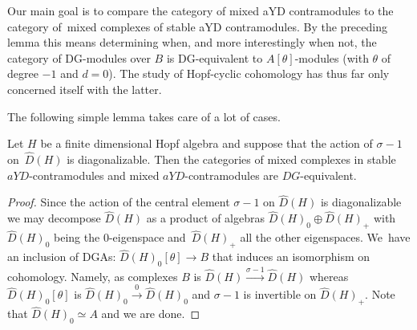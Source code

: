 Our main goal is to compare the category of mixed
aYD contramodules to the category of~mixed complexes of stable aYD
contramodules. By the preceding lemma this means determining when,
and more interestingly when not, the category of DG-modules over $B$ is DG-equivalent to $A[\theta]$-modules (with $\theta$ of degree $-1$ and $d=0$). The study of Hopf-cyclic cohomology has thus far only concerned itself with the latter.

The following simple lemma takes care of a lot of cases.

\begin{Lemma}\label{diag}
Let $H$ be a finite dimensional Hopf algebra and suppose that the action of $\sigma-1$ on~$\widehat{D}(H)$ is diagonalizable. Then the categories of mixed complexes in stable $aYD$-contramodules and mixed $aYD$-contramodules are $DG$-equivalent.
\end{Lemma}

\begin{proof}
Since the action of the central element $\sigma-1$ on $\widehat{D}(H)$ is diagonalizable we may decom\-pose $\widehat{D}(H)$ as a product of algebras $\widehat{D}(H)_0\oplus \widehat{D}(H)_+$ with $\widehat{D}(H)_0$ being the $0$-eigenspace and~$\widehat{D}(H)_+$ all the other eigenspaces. We~have an inclusion of DGAs: $\widehat{D}(H)_0[\theta]\to B$ that induces an isomorphism on cohomology. Namely, as complexes $B$ is $\widehat{D}(H)\stackrel{\sigma-1}{\to}\widehat{D}(H)$ whereas $\widehat{D}(H)_0[\theta]$ is $\widehat{D}(H)_0\stackrel{0}{\to}\widehat{D}(H)_0$ and $\sigma-1$ is invertible on $\widehat{D}(H)_+$. Note that $\widehat{D}(H)_0\simeq A$ and we are done.
\end{proof}

